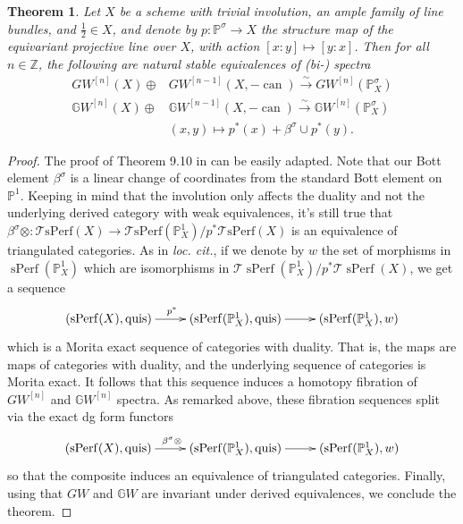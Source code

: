 \documentclass[edeposit,fullpage]{uiucthesis2009}
\newcommand{\mbb}{\mathbb}
\newcommand{\mc}{\mathcal}
\DeclareMathOperator{\can}{can}
\DeclareMathOperator{\sPerf}{sPerf}
\theoremstyle{plain}
\numberwithin{lemma}{section}
\newtheorem{theorem}[lemma]{Theorem}
\theoremstyle{definition}
\begin{document}
\begin{theorem} \label{thm:proj_inv}
Let $X$ be a scheme with trivial involution, an ample family of line
bundles, and $\frac{1}{2} \in X$, and denote by $p : \mbb P^\sigma
\rightarrow X$ the structure map of the equivariant projective line
over $X$, with action $[x:y] \mapsto [y:x]$. Then for all $n \in \mbb
Z$, the following are natural stable equivalences of (bi-) spectra
\begin{align*}
GW^{[n]}(X) \oplus & GW^{[n-1]}(X,-\can) \xrightarrow{\sim}
GW^{[n]}(\mbb P^\sigma_X)\\
 \mbb GW^{[n]}(X) \oplus & \mbb GW^{[n-1]}(X,-\can) \xrightarrow{\sim}
\mbb GW^{[n]}(\mbb P^\sigma_X)\\
&(x,y) \mapsto p^*(x) + \beta^\sigma \cup p^*(y).
\end{align*}
\end{theorem}

\begin{proof}
The proof of Theorem 9.10 in \cite{Schder} can be easily adapted. Note
that our Bott element $\beta^\sigma$ is  a linear change of
coordinates from the standard Bott element on $\mbb P^1$. Keeping in
mind that the involution only affects the duality and not the
underlying derived category with weak equivalences, it's still true
that $\beta^\sigma \otimes : \mc T\mathrm{sPerf}(X) \rightarrow \mc
T\mathrm{sPerf}(\mbb P^1_X)/p^*\mc T\mathrm{sPerf}(X)$ is an
equivalence of triangulated categories. As in
\textit{loc. cit.}, if we denote by $w$ the set of morphisms in
$\sPerf(\mbb P^1_X)$ which are isomorphisms in $\mc T\sPerf(\mbb
P^1_X)/p^*\mc T\sPerf(X)$, we get a sequence
\[
\xymatrix{(\sPerf(X),\mathrm{quis}) \ar[r]^{p^*} & (\sPerf(\mbb
  P^1_X),\mathrm{quis}) \ar[r] & (\sPerf(\mbb P^1_X),w)}
\]
which is a Morita exact sequence of categories with duality. That is,
the maps are maps of categories with duality, and the underlying
sequence of categories is Morita exact. It follows that this sequence
induces a homotopy fibration of $GW^{[n]}$ and $\mbb GW^{[n]}$
spectra. As remarked above, these fibration sequences split via the
exact dg form functors
\[
\xymatrix{(\sPerf(X),\mathrm{quis}) \ar[r]^{\beta^\sigma \otimes} & (\sPerf(\mbb
  P^1_X),\mathrm{quis}) \ar[r] & (\sPerf(\mbb P^1_X),w)}
\]
so that the composite induces an equivalence of triangulated categories.
Finally, using that $GW$ and $\mbb GW$ are invariant under derived
equivalences, we conclude the theorem.
\end{proof}
\end{document}
